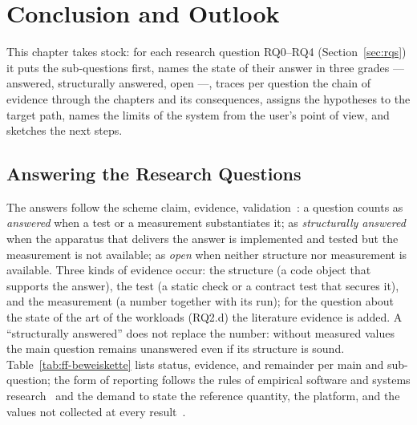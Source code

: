 \chapter{Conclusion and Outlook}\label{ch:conclusion}

This chapter takes stock: for each research question RQ0--RQ4 (Section~\ref{sec:rqs}) it puts the
sub-questions first, names the state of their answer in three grades --- answered, structurally
answered, open ---, traces per question the chain of evidence through the chapters and its
consequences, assigns the hypotheses to the target path, names the limits of the system from the
user's point of view, and sketches the next steps.

\section{Answering the Research Questions}\label{sec:answers}
The answers follow the scheme claim, evidence, validation~\cite{shaw2003writing}: a question counts as
\emph{answered} when a test or a measurement substantiates it; as \emph{structurally answered} when
the apparatus that delivers the answer is implemented and tested but the measurement is not
available; as \emph{open} when neither structure nor measurement is available. Three kinds of
evidence occur: the structure (a code object that supports the answer), the test (a static check or a
contract test that secures it), and the measurement (a number together with its run); for the
question about the state of the art of the workloads (RQ2.d) the literature evidence is added. A
\enquote{structurally answered} does not replace the number: without measured values the main question
remains unanswered even if its structure is sound. Table~\ref{tab:ff-beweiskette} lists status,
evidence, and remainder per main and sub-question; the form of reporting follows the rules of empirical
software and systems research~\cite{wohlin2012experimentation,runeson2009guidelines} and the demand to
state the reference quantity, the platform, and the values not collected at every
result~\cite{blackburn2016truth,hoefler2015benchmarking}.

